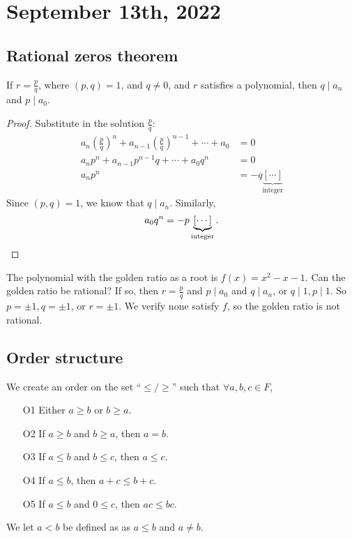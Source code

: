\documentclass[11pt]{scrartcl}
\numberwithin{equation}{section}
\begin{document}
\section{September 13th, 2022}
\subsection{Rational zeros theorem}
\begin{theorem}
    \label{thm:ratzthm}
    If $r=\frac{p}{q}$, where $(p,q)=1$, and $q \neq 0$, and $r$ satisfies a polynomial, then $q \mid a_n$ and $p \mid a_0$.
\end{theorem}
\begin{proof}
    Substitute in the solution $\frac{p}{q}$:
    \begin{align*}
        a_n \left(\frac{p}{q}\right)^n + a_{n-1} \left(\frac{p}{q}\right)^{n-1}+\cdots+a_0 &=0 \\
        a_n p^n + a_{n-1} p^{n-1}q+\cdots+a_0q^n &=0 \\
        a_np^n &= -q\underbrace{[\cdots]}_{\text{integer}}
    \end{align*}
    Since $(p,q)=1$, we know that $q\mid a_n$.
    Similarly, 
    \[ a_0q^n = -p\underbrace{[\cdots]}_{\text{integer}}.\qedhere\]
\end{proof}
\begin{example}
    The polynomial with the golden 
    ratio as a root is $f(x) = x^2-x-1$. Can the golden ratio be rational? If so, then $r=\frac{p}{q}$ and $p\mid a_0$ and 
    $q\mid a_n$, or $q\mid1, p\mid1$. So $p=\pm1,q=\pm1$, or $r=\pm1$.
    We verify none satisfy $f$, so the golden ratio is not rational.
\end{example}
\subsection{Order structure}

\begin{axiom}
    We create an order on the set ``$\leq/\geq$'' such that $\forall a,b,c\in F$,
    \begin{itemize}
        \item[O1] Either $a\geq b$ or $b\geq a$.
        \item[O2] If $a\geq b$ and $b\geq a$, then $a=b$.
        \item[O3] If $a\leq b$ and $b\leq c$, then $a \leq c$.
        \item[O4] If $a\leq b$, then $a+c\leq b+c$.
        \item[O5] If $a\leq b$ and $0\leq c$, then $ac \leq bc$. 
    \end{itemize}
    We let $a<b$ be defined as as $a\leq b$ and $a\neq b$.
\end{axiom}
\end{document}
